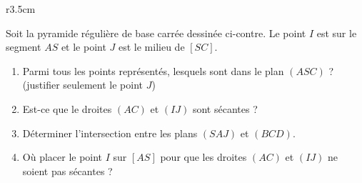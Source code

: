 
\begin{exercice}\label{exosmath-0700}

\begin{wrapfigure}{r}{3.5cm}
   \vspace{-0.5cm}        %
   \centering
   
\end{wrapfigure}

        Soit la pyramide régulière de base carrée dessinée ci-contre. Le point \( I\) est sur le segment \( AS\) et le point \( J\) est le milieu de \( [SC]\).
        \begin{enumerate}
            \item
                Parmi tous les points représentés, lesquels sont dans le plan \( (ASC)\) ? (justifier seulement le point \( J\))
            \item
                Est-ce que le droites \( (AC)\) et \( (IJ)\) sont sécantes ?
            \item
                Déterminer l'intersection entre les plans \( (SAJ)\) et \( (BCD)\).
            \item
                Où placer le point \( I\) sur \( [AS]\) pour que les droites \( (AC)\) et \( (IJ)\) ne soient pas sécantes ?
        \end{enumerate}


\end{exercice}
